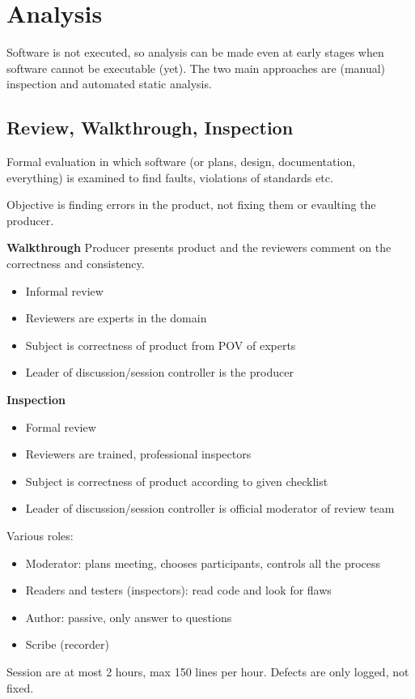 \section{Analysis}
Software is not executed, so analysis can be made even at early stages when software cannot be executable (yet).
The two main approaches are (manual) inspection and automated static analysis.

\subsection{Review, Walkthrough, Inspection}
Formal evaluation in which software (or plans, design, documentation, everything) is examined to find faults, violations of standards etc.

Objective is finding errors in the product, not fixing them or evaulting the producer.

\textbf{Walkthrough}
Producer presents product and the reviewers comment on the correctness and consistency.
\begin{itemize}
    \item Informal review
    \item Reviewers are experts in the domain
    \item Subject is correctness of product from POV of experts
    \item Leader of discussion/session controller is the producer
\end{itemize}

\textbf{Inspection}
\begin{itemize}
    \item Formal review
    \item Reviewers are trained, professional inspectors
    \item Subject is correctness of product according to given checklist
    \item Leader of discussion/session controller is official moderator of review team
\end{itemize}
Various roles:
\begin{itemize}
    \item Moderator: plans meeting, chooses participants, controls all the process
    \item Readers and testers (inspectors): read code and look for flaws
    \item Author: passive, only answer to questions
    \item Scribe (recorder)
\end{itemize}
Session are at most 2 hours, max 150 lines per hour.
Defects are only logged, not fixed.

